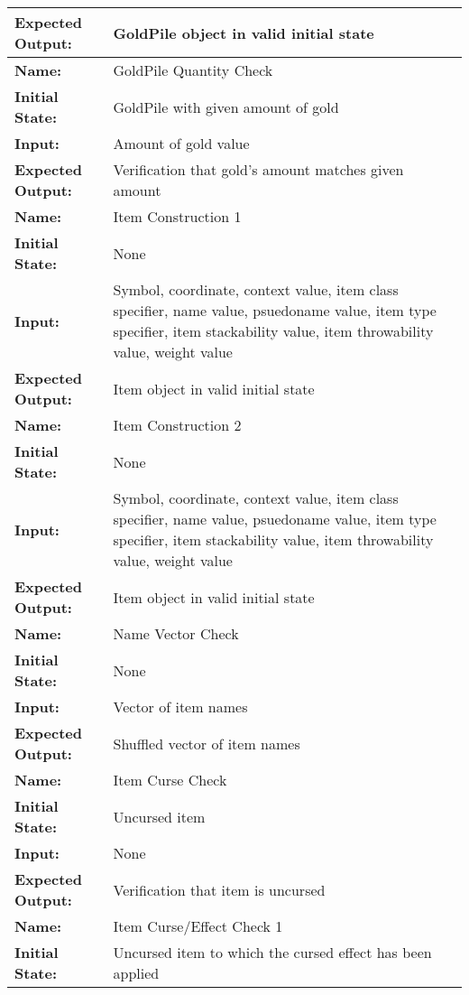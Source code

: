 \documentclass[12pt, titlepage]{article}
\begin{document}
\begin{center}
\begin{longtable}{ l | p{10cm} }
				\textbf{Expected Output:} & GoldPile object in valid initial state\\[1em]
				\hline
				\rule{0pt}{2em}\textbf{Name:} & GoldPile Quantity Check\\
				\textbf{Initial State:} & GoldPile with given amount of gold\\
				\textbf{Input:} & Amount of gold value\\
				\textbf{Expected Output:} & Verification that gold's amount matches given amount\\[1em]
				\hline
				\rule{0pt}{2em}\textbf{Name:} & Item Construction 1\\
				\textbf{Initial State:} & None\\
				\textbf{Input:} & Symbol, coordinate, context value, item class specifier, name value, psuedoname value, item type specifier, item stackability value, item throwability value, weight value\\
				\textbf{Expected Output:} & Item object in valid initial state\\[1em]
				\rule{0pt}{2em}\textbf{Name:} & Item Construction 2\\
				\textbf{Initial State:} & None\\
				\textbf{Input:} & Symbol, coordinate, context value, item class specifier, name value, psuedoname value, item type specifier, item stackability value, item throwability value, weight value\\
				\textbf{Expected Output:} & Item object in valid initial state\\[1em]
				\hline
				\rule{0pt}{2em}\textbf{Name:} & Name Vector Check\\
				\textbf{Initial State:} & None\\
				\textbf{Input:} & Vector of item names\\
				\textbf{Expected Output:} & Shuffled vector of item names\\[1em]
				\hline
				\rule{0pt}{2em}\textbf{Name:} & Item Curse Check\\
				\textbf{Initial State:} & Uncursed item\\
				\textbf{Input:} & None\\
				\textbf{Expected Output:} & Verification that item is uncursed\\[1em]
				\hline
				\rule{0pt}{2em}\textbf{Name:} & Item Curse/Effect Check 1\\
				\textbf{Initial State:} & Uncursed item to which the cursed effect has been applied\\

\end{longtable}
\end{center}
\end{document}
